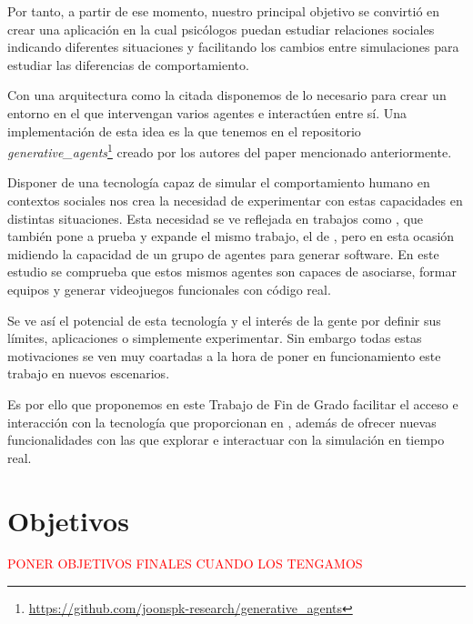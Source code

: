 Por tanto, a partir de ese momento, nuestro principal objetivo se convirtió en crear una aplicación en la cual psicólogos puedan estudiar relaciones sociales indicando diferentes situaciones y facilitando los cambios entre simulaciones para estudiar las diferencias de comportamiento.

Con una arquitectura como la citada disponemos de lo necesario para crear un entorno en el que intervengan varios agentes e interactúen entre sí. Una implementación de esta idea es la que tenemos en el repositorio {\textit{generative\_agents}}\footnote{\url{https://github.com/joonspk-research/generative_agents}} creado por los autores del paper mencionado anteriormente.

Disponer de una tecnología capaz de simular el comportamiento humano en contextos sociales nos crea la necesidad de experimentar con estas capacidades en distintas situaciones. Esta necesidad se ve reflejada en trabajos como \cite{qian2023communicative}, que también pone a prueba y expande el mismo trabajo, el de \cite{park2023generative}, pero en esta ocasión midiendo la capacidad de un grupo de agentes para generar software. En este estudio se comprueba que estos mismos agentes son capaces de asociarse, formar equipos y generar videojuegos funcionales con código real.

Se ve así el potencial de esta tecnología y el interés de la gente por definir sus límites, aplicaciones o simplemente experimentar.
Sin embargo todas estas motivaciones se ven muy coartadas a la hora de poner en funcionamiento este trabajo en nuevos escenarios.

Es por ello que proponemos en este Trabajo de Fin de Grado facilitar el acceso e interacción con la tecnología que proporcionan en \ga, además de ofrecer nuevas funcionalidades con las que explorar e interactuar con la simulación en tiempo real.

\section{Objetivos}
\textcolor{red}{PONER OBJETIVOS FINALES CUANDO LOS TENGAMOS}

